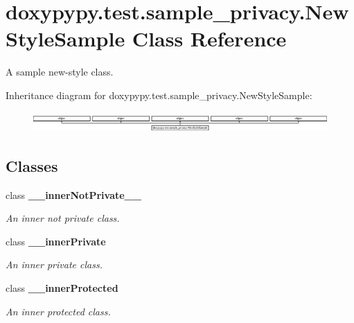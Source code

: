 \hypertarget{classdoxypypy_1_1test_1_1sample__privacy_1_1_new_style_sample}{\section{doxypypy.\-test.\-sample\-\_\-privacy.\-New\-Style\-Sample Class Reference}
\label{classdoxypypy_1_1test_1_1sample__privacy_1_1_new_style_sample}
}


A sample new-\/style class.  


Inheritance diagram for doxypypy.\-test.\-sample\-\_\-privacy.\-New\-Style\-Sample\-:\begin{figure}[H]
\begin{center}
\leavevmode
\includegraphics[height=0.775087cm]{classdoxypypy_1_1test_1_1sample__privacy_1_1_new_style_sample}
\end{center}
\end{figure}
\subsection*{Classes}
\begin{DoxyCompactItemize}
\item 
class {\bfseries \-\_\-\-\_\-inner\-Not\-Private\-\_\-\-\_\-}
\begin{DoxyCompactList}\small\item\em An inner not private class. \end{DoxyCompactList}\item 
class {\bfseries \-\_\-\-\_\-inner\-Private}
\begin{DoxyCompactList}\small\item\em An inner private class. \end{DoxyCompactList}\item 
class {\bfseries \-\_\-\-\_\-inner\-Protected}
\begin{DoxyCompactList}\small\item\em An inner protected class. \end{DoxyCompactList}\end{DoxyCompactItemize}
